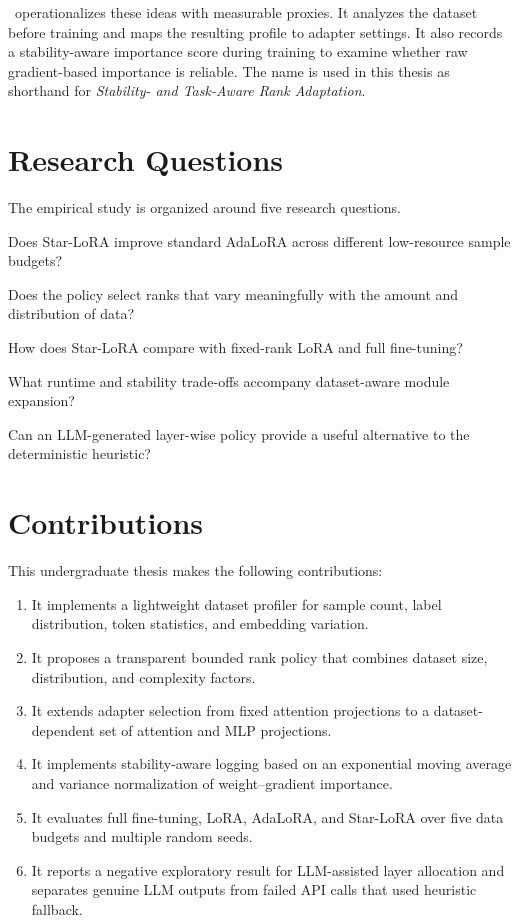 \starlora\ operationalizes these ideas with measurable proxies. It analyzes the dataset before
training and maps the resulting profile to adapter settings. It also records a stability-aware
importance score during training to examine whether raw gradient-based importance is reliable.
The name is used in this thesis as shorthand for \emph{Stability- and Task-Aware Rank Adaptation}.

\section{Research Questions}

The empirical study is organized around five research questions.
\begin{description}[style=nextline,leftmargin=1.4cm]
  \item[RQ1] Does Star-LoRA improve standard AdaLoRA across different low-resource sample budgets?
  \item[RQ2] Does the policy select ranks that vary meaningfully with the amount and distribution
  of data?
  \item[RQ3] How does Star-LoRA compare with fixed-rank LoRA and full fine-tuning?
  \item[RQ4] What runtime and stability trade-offs accompany dataset-aware module expansion?
  \item[RQ5] Can an LLM-generated layer-wise policy provide a useful alternative to the
  deterministic heuristic?
\end{description}

\section{Contributions}

This undergraduate thesis makes the following contributions:
\begin{enumerate}
  \item It implements a lightweight dataset profiler for sample count, label distribution,
  token statistics, and embedding variation.
  \item It proposes a transparent bounded rank policy that combines dataset size, distribution,
  and complexity factors.
  \item It extends adapter selection from fixed attention projections to a dataset-dependent set
  of attention and MLP projections.
  \item It implements stability-aware logging based on an exponential moving average and
  variance normalization of weight--gradient importance.
  \item It evaluates full fine-tuning, LoRA, AdaLoRA, and Star-LoRA over five data budgets and
  multiple random seeds.
  \item It reports a negative exploratory result for LLM-assisted layer allocation and separates
  genuine LLM outputs from failed API calls that used heuristic fallback.
\end{enumerate}

